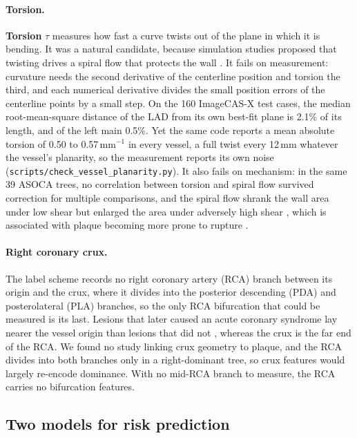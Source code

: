 \paragraph{Torsion.}
\textbf{Torsion} $\tau$ measures how fast a curve twists out of the plane in which it is bending.
It was a natural candidate, because simulation studies proposed that twisting drives a spiral flow that protects the wall \cite{shen2026geometry}.
It fails on measurement: curvature needs the second derivative of the centerline position and torsion the third, and each numerical derivative divides the small position errors of the centerline points by a small step.
On the 160 ImageCAS-X test cases, the median root-mean-square distance of the LAD from its own best-fit plane is 2.1\% of its length, and of the left main 0.5\%.
Yet the same code reports a mean absolute torsion of 0.50 to 0.57\,mm$^{-1}$ in every vessel, a full twist every 12\,mm whatever the vessel's planarity, so the measurement reports its own noise (\texttt{scripts/check\_vessel\_planarity.py}).
It also fails on mechanism: in the same 39 ASOCA trees, no correlation between torsion and spiral flow survived correction for multiple comparisons, and the spiral flow shrank the wall area under low shear but enlarged the area under adversely high shear \cite{shen2025helical}, which is associated with plaque becoming more prone to rupture \cite{bajraktari2021highwss}.

\paragraph{Right coronary crux.}
The label scheme records no right coronary artery (RCA) branch between its origin and the crux, where it divides into the posterior descending (PDA) and posterolateral (PLA) branches, so the only RCA bifurcation that could be measured is its last.
Lesions that later caused an acute coronary syndrome lay nearer the vessel origin than lesions that did not \cite{han2022plaque}, whereas the crux is the far end of the RCA.
We found no study linking crux geometry to plaque, and the RCA divides into both branches only in a right-dominant tree, so crux features would largely re-encode dominance.
With no mid-RCA branch to measure, the RCA carries no bifurcation features.

\subsection{Two models for risk prediction}

